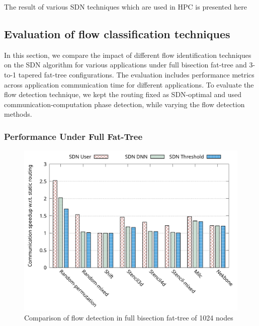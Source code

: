 The result of various SDN techniques which are used in HPC is presented here

\subsection{Evaluation of flow classification techniques}

In this section, we compare the impact of different flow identification techniques on the SDN algorithm for various applications under full bisection fat-tree and 3-to-1 tapered fat-tree configurations. The evaluation includes performance metrics across application communication time for different applications. To evaluate the flow detection technique, we kept the routing fixed as SDN‑optimal and used communication‑computation phase detection, while varying the flow detection methods.

\subsubsection{Performance Under Full Fat-Tree}
\begin{figure}[h]
  \centering
  \includegraphics[width=\columnwidth]{./figs_4/full_fat_flow_detection.pdf}
  \caption{Comparison of flow detection in full bisection fat-tree of 1024 nodes}
  \label{fig:fld_full}
\end{figure}

